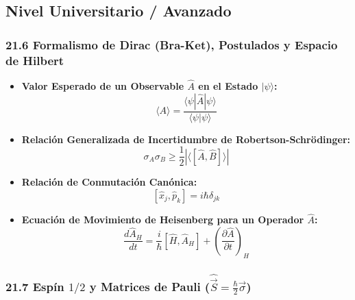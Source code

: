 \documentclass[11pt,a4paper]{article}
\begin{document}
\subsection*{Nivel Universitario / Avanzado}

\subsubsection*{21.6 Formalismo de Dirac (Bra-Ket), Postulados y Espacio de Hilbert}

\begin{itemize}
  \item \textbf{Valor Esperado de un Observable $\hat{A}$ en el Estado $|\psi\rangle$:}
  \[
    \langle A \rangle = \frac{\langle\psi|\hat{A}|\psi\rangle}{\langle\psi|\psi\rangle}
  \]
  \item \textbf{Relación Generalizada de Incertidumbre de Robertson-Schrödinger:}
  \[
    \sigma_A \sigma_B \ge \frac{1}{2} |\langle [\hat{A}, \hat{B}] \rangle|
  \]
  \item \textbf{Relación de Conmutación Canónica:}
  \[
    [\hat{x}_j, \hat{p}_k] = i\hbar \delta_{jk}
  \]
  \item \textbf{Ecuación de Movimiento de Heisenberg para un Operador $\hat{A}$:}
  \[
    \frac{d\hat{A}_H}{dt} = \frac{i}{\hbar}[\hat{H}, \hat{A}_H] + \left( \frac{\partial\hat{A}}{\partial t} \right)_H
  \]
\end{itemize}

\subsubsection*{21.7 Espín $1/2$ y Matrices de Pauli ($\hat{\vec{S}} = \frac{\hbar}{2}\vec{\sigma}$)}
\end{document}
